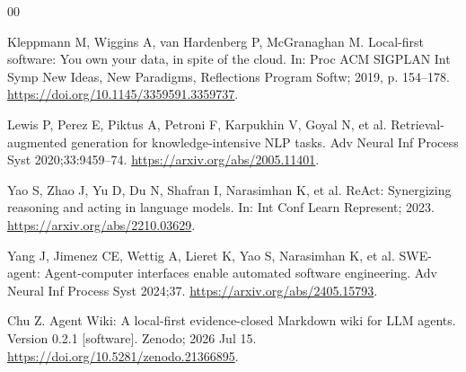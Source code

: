 \documentclass[preprint,12pt,a4paper]{elsarticle}
\begin{document}
\begin{thebibliography}{00}

Kleppmann M, Wiggins A, van Hardenberg P, McGranaghan M. Local-first software:
You own your data, in spite of the cloud. In: Proc ACM SIGPLAN Int Symp New
Ideas, New Paradigms, Reflections Program Softw; 2019, p. 154--178.
\url{https://doi.org/10.1145/3359591.3359737}.

Lewis P, Perez E, Piktus A, Petroni F, Karpukhin V, Goyal N, et al.
Retrieval-augmented generation for knowledge-intensive NLP tasks. Adv Neural
Inf Process Syst 2020;33:9459--74.
\url{https://arxiv.org/abs/2005.11401}.

Yao S, Zhao J, Yu D, Du N, Shafran I, Narasimhan K, et al. ReAct: Synergizing
reasoning and acting in language models. In: Int Conf Learn Represent; 2023.
\url{https://arxiv.org/abs/2210.03629}.

Yang J, Jimenez CE, Wettig A, Lieret K, Yao S, Narasimhan K, et al. SWE-agent:
Agent-computer interfaces enable automated software engineering. Adv Neural Inf
Process Syst 2024;37.
\url{https://arxiv.org/abs/2405.15793}.

Chu Z. Agent Wiki: A local-first evidence-closed Markdown wiki for LLM agents.
Version 0.2.1 [software]. Zenodo; 2026 Jul 15.
\url{https://doi.org/10.5281/zenodo.21366895}.

\end{thebibliography}
\end{document}

